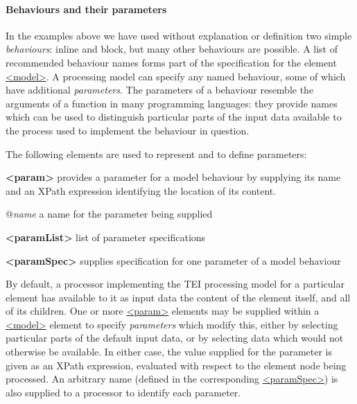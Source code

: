 \paragraph[{Behaviours and their parameters}]{Behaviours and their parameters}\label{TDPMMB}\par
In the examples above we have used without explanation or definition two simple \textit{behaviours}: \textsf{inline} and \textsf{block}, but many other behaviours are possible. A list of recommended behaviour names forms part of the specification for the element \hyperref[TEI.model]{<model>}. A processing model can specify any named behaviour, some of which have additional \textit{parameters}. The \textsf{parameters} of a \textsf{behaviour} resemble the arguments of a function in many programming languages: they provide names which can be used to distinguish particular parts of the input data available to the process used to implement the behaviour in question.\par
The following elements are used to represent and to define parameters: 
\begin{sansreflist}
  
\item [\textbf{<param>}] provides a parameter for a model behaviour by supplying its name and an XPath expression identifying the location of its content.\hfil\\[-10pt]\begin{sansreflist}
    \item[@{\itshape name}]
  a name for the parameter being supplied
\end{sansreflist}  
\item [\textbf{<paramList>}] list of parameter specifications
\item [\textbf{<paramSpec>}] supplies specification for one parameter of a model behaviour
\end{sansreflist}
\par
By default, a processor implementing the TEI processing model for a particular element has available to it as input data the content of the element itself, and all of its children. One or more \hyperref[TEI.param]{<param>} elements may be supplied within a \hyperref[TEI.model]{<model>} element to specify \textit{parameters} which modify this, either by selecting particular parts of the default input data, or by selecting data which would not otherwise be available. In either case, the value supplied for the parameter is given as an XPath expression, evaluated with respect to the element node being processed. An arbitrary name (defined in the corresponding \hyperref[TEI.paramSpec]{<paramSpec>}) is also supplied to a processor to identify each parameter.\par
